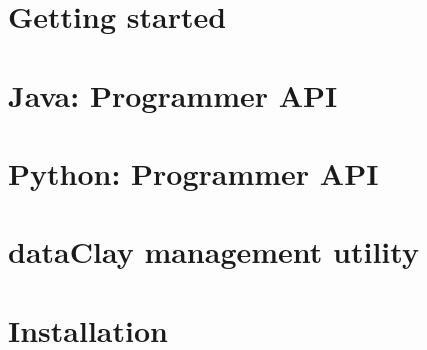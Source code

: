 \documentclass[11pt,fleqn]{book} %
\begin{document}
\tableofcontents %

\cleardoublepage %

\pagestyle{fancy} %

\renewcommand\labelitemi{}
\setlength{\parindent}{0pt}



\part{Getting started}
  
  
  

\part{Java: Programmer API}
  
%  
%  

\part{Python: Programmer API}
  
%  
%  
%  

\part{dataClay management utility}
  

%  
%  
%  

\part{Installation}
\label{part:installation}
  
  
\end{document}
